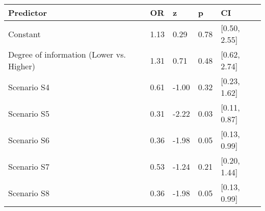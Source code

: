 \begin{tabular}{lllll}
  \toprule
Predictor & OR & z & p & CI \\ 
  \midrule
Constant & 1.13 & 0.29 & 0.78 & [0.50, 2.55] \\ 
  Degree of information (Lower vs. Higher) & 1.31 & 0.71 & 0.48 & [0.62, 2.74] \\ 
  Scenario S4 & 0.61 & -1.00 & 0.32 & [0.23, 1.62] \\ 
  Scenario S5 & 0.31 & -2.22 & 0.03 & [0.11, 0.87] \\ 
  Scenario S6 & 0.36 & -1.98 & 0.05 & [0.13, 0.99] \\ 
  Scenario S7 & 0.53 & -1.24 & 0.21 & [0.20, 1.44] \\ 
  Scenario S8 & 0.36 & -1.98 & 0.05 & [0.13, 0.99] \\ 
   \bottomrule
\end{tabular}
